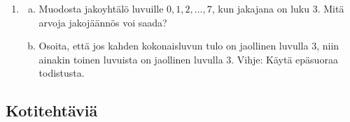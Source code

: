 \begin{enumerate}
\item
\begin{enumerate}[a)]
\item Muodosta jakoyhtälö luvuille $0, 1, 2, \ldots, 7$, kun jakajana on luku $3$. Mitä arvoja jakojäännös voi saada?
\item Osoita, että jos kahden kokonaisluvun tulo on jaollinen luvulla $3$, niin ainakin toinen luvuista on jaollinen luvulla $3$. Vihje: Käytä epäsuoraa todistusta.
\end{enumerate}

\end{enumerate}

\subsection*{Kotitehtäviä}

